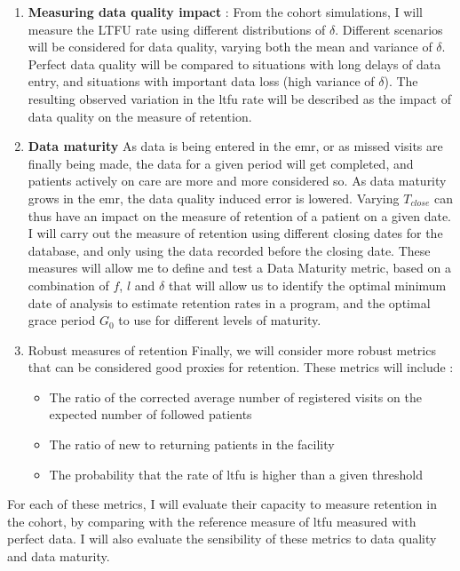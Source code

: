 \begin{enumerate}
\item \textbf{Measuring data quality impact} : From the cohort simulations, I will measure the LTFU rate using different distributions  of $\delta$. Different scenarios will be considered for data quality, varying both the mean and variance of $\delta$. Perfect data quality will be compared to situations with long delays of data entry, and situations with important data loss (high variance of $\delta$). The resulting observed variation in the \gls{ltfu} rate  will be described as the impact of data quality on the measure of retention.

\item \textbf{Data maturity} As data is being entered in the \gls{emr}, or as missed visits are finally being made, the data for a given period will get completed, and patients actively on care are more and more considered so. As data maturity grows in the  \gls{emr}, the data quality induced error is lowered. Varying $T_{close}$ can thus have an impact on the measure of retention of a patient on a given date. I will carry out the measure of retention using different closing dates for the database, and only using the data recorded before the closing date. These measures will allow me to define and test a Data Maturity metric, based on a combination of $f$, $l$ and $\delta$ that will allow us to identify the optimal minimum date of analysis to estimate retention rates in a program, and the optimal grace period $G_0$ to use for different levels of maturity.

\item{Robust measures of retention} Finally, we will consider more robust metrics that can be considered good proxies for retention. These metrics will include :
\begin{itemize}
	\item The ratio of the corrected average number of registered visits on the expected number of followed patients
	\item The ratio of new to returning patients in the facility
	\item The probability that the rate of \gls{ltfu} is higher than a given threshold
\end{itemize}
\end{enumerate}

For each of these metrics, I will evaluate their capacity to measure retention in the cohort, by comparing with the reference measure of \gls{ltfu}  measured with perfect data. I will also evaluate the sensibility of these metrics to data quality and data maturity.

